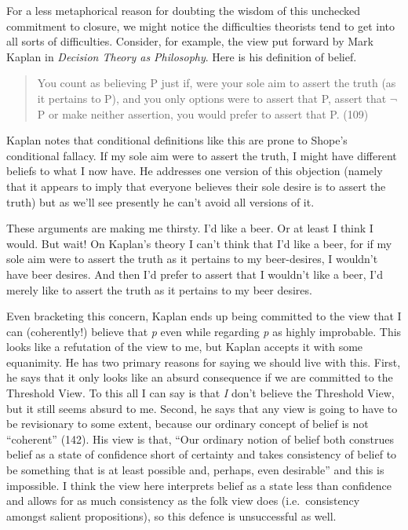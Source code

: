 \documentclass[
  11pt,
  letterpaper,
  DIV=11,
  numbers=noendperiod,
  oneside]{scrartcl}
\begin{document}
For a less metaphorical reason for doubting the wisdom of this unchecked
commitment to closure, we might notice the difficulties theorists tend
to get into all sorts of difficulties. Consider, for example, the view
put forward by Mark Kaplan in \emph{Decision Theory as Philosophy}. Here
is his definition of belief.

\begin{quote}
You count as believing P just if, were your sole aim to assert the truth
(as it pertains to P), and you only options were to assert that P,
assert that \(\neg\)P or make neither assertion, you would prefer to
assert that P. (109)
\end{quote}

Kaplan notes that conditional definitions like this are prone to Shope's
conditional fallacy. If my sole aim were to assert the truth, I might
have different beliefs to what I now have. He addresses one version of
this objection (namely that it appears to imply that everyone believes
their sole desire is to assert the truth) but as we'll see presently he
can't avoid all versions of it.

These arguments are making me thirsty. I'd like a beer. Or at least I
think I would. But wait! On Kaplan's theory I can't think that I'd like
a beer, for if my sole aim were to assert the truth as it pertains to my
beer-desires, I wouldn't have beer desires. And then I'd prefer to
assert that I wouldn't like a beer, I'd merely like to assert the truth
as it pertains to my beer desires.

Even bracketing this concern, Kaplan ends up being committed to the view
that I can (coherently!) believe that \emph{p} even while regarding
\emph{p} as highly improbable. This looks like a refutation of the view
to me, but Kaplan accepts it with some equanimity. He has two primary
reasons for saying we should live with this. First, he says that it only
looks like an absurd consequence if we are committed to the Threshold
View. To this all I can say is that \emph{I} don't believe the Threshold
View, but it still seems absurd to me. Second, he says that any view is
going to have to be revisionary to some extent, because our ordinary
concept of belief is not ``coherent'' (142). His view is that, ``Our
ordinary notion of belief both construes belief as a state of confidence
short of certainty and takes consistency of belief to be something that
is at least possible and, perhaps, even desirable'' and this is
impossible. I think the view here interprets belief as a state less than
confidence and allows for as much consistency as the folk view does
(i.e.~consistency amongst salient propositions), so this defence is
unsuccessful as well.
\end{document}
